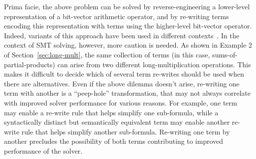 Prima facie, the above problem can be solved by reverse-engineering a
lower-level representation of a bit-vector arithmetic operator, and by
re-writing terms encoding this representation with terms using the
higher-level bit-vector operator.  Indeed, variants of this approach
have been used in different
contexts~\cite{kunz,ciesielski,kolbl,reveng,earlier-pat-match-synopsys}.
In the context of SMT solving, however, more caution is needed.
As shown in Example $2$ of Section~\ref{sec:long-mult}, the same
collection of terms (in this case, sums-of-partial-products) can arise
from two different long-multiplication operations.  This makes it
difficult to decide which of several term re-writes should be
used when there are alternatives. %
Even if the above dilemma doesn't arise, re-writing one term with
another is a ``peep-hole'' transformation, that may not always
correlate with improved solver performance for various
reasons.  %
For example, one term may enable a re-write rule that helps simplify
one sub-formula, while a syntactically distinct but semantically
equivalent term may enable another re-write rule that helps simplify
another sub-formula. Re-writing one term by another precludes the
possibility of both terms contributing to improved performance of
the solver.%

